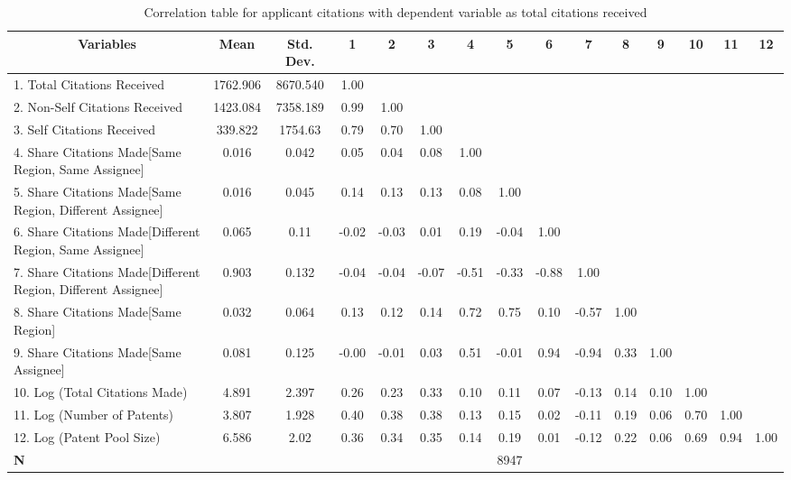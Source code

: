 \begin{table}[htbp]\centering \caption{Correlation table for applicant citations with dependent variable as total citations received \label{a.tcorrelation}}
\scriptsize
\onehalfspacing
\begin{adjustbox}{angle=90}
\begin{tabular}{l  c  c  c  c  c  c  c  c  c  c  c  c  c  c }\hline\hline
\multicolumn{1}{c}{Variables} & \textbf{Mean}& \textbf{Std. Dev.}&1&2&3&4&5&6&7&8&9&10&11&12\\ \hline
1. Total Citations Received& 1762.906 & 8670.540&1.00\\
2. Non-Self Citations Received& 1423.084 & 7358.189&0.99&1.00\\
3. Self Citations Received& 339.822 & 1754.63&0.79&0.70&1.00\\
4. Share Citations Made[Same Region, Same Assignee] & 0.016 & 0.042&0.05&0.04&0.08&1.00\\
5. Share Citations Made[Same Region, Different Assignee]& 0.016 & 0.045&0.14&0.13&0.13&0.08&1.00\\
6. Share Citations Made[Different Region, Same Assignee]& 0.065 & 0.11&-0.02&-0.03&0.01&0.19&-0.04&1.00\\
7. Share Citations Made[Different Region, Different Assignee]& 0.903 & 0.132&-0.04&-0.04&-0.07&-0.51&-0.33&-0.88&1.00\\
8. Share Citations Made[Same Region]& 0.032 & 0.064&0.13&0.12&0.14&0.72&0.75&0.10&-0.57&1.00\\
9. Share Citations Made[Same Assignee] & 0.081 & 0.125&-0.00&-0.01&0.03&0.51&-0.01&0.94&-0.94&0.33&1.00\\
10. Log (Total Citations Made)& 4.891 & 2.397&0.26&0.23&0.33&0.10&0.11&0.07&-0.13&0.14&0.10&1.00\\
11. Log (Number of Patents)& 3.807 & 1.928&0.40&0.38&0.38&0.13&0.15&0.02&-0.11&0.19&0.06&0.70&1.00\\
12. Log (Patent Pool Size)& 6.586 & 2.02&0.36&0.34&0.35&0.14&0.19&0.01&-0.12&0.22&0.06&0.69&0.94&1.00\\
\hline
\textbf{N}&&&&&&&8947\\
\hline \hline 
 \end{tabular}
 \end{adjustbox}
\end{table}
